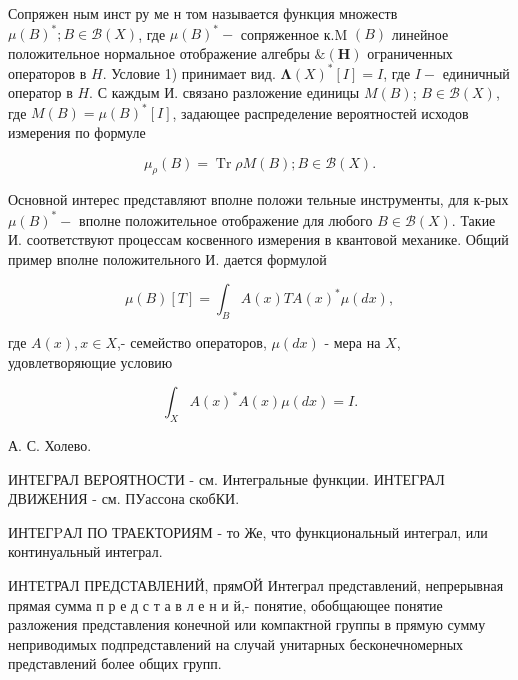 \documentclass[10pt]{article}
\begin{document}
Сопряжен ным инст ру ме н том называется функция множеств $\mu(B)^{*} ; B \in \mathscr{B}(X)$, где $\mathscr{\mu}(B)^{*}-$ сопряженное к.M $(B)$ линейное положительное нормальное отображение алгебры $\mathcal{\&}(\boldsymbol{H})$ ограниченных операторов в $H$. Условие 1) принимает вид. $\boldsymbol{\Lambda}(X)^{*}[I]=I$, где $I-$ единичный оператор в $H$. С каждым И. связано разложение единицы $M(B)$; $B \in \mathcal{B}(X)$, где $M(B)=\mathscr{\mu}(B)^{*}[I]$, задающее распределение вероятностей исходов измерения по формуле



\[

\mu_{\rho}(B)=\operatorname{Tr} \rho M(B) ; B \in \mathscr{B}(X) .

\]



Основной интерес представляют вполне положи тельные инструменты, для к-рых $\mathscr{\mu}(B)^{*}-$ вполне положительное отображение для любого $B \in \mathscr{B}(X)$. Такие И. соответствуют процессам косвенного измерения в квантовой механике. Общий пример вполне положительного И. дается формулой



\[

\mu(B)[T]=\int_{B} A(x) T A(x)^{*} \mu(d x),

\]



где $A(x), x \in X$,- семейство операторов, $\mu(d x)$ - мера на $X$, удовлетворяющие условию



\[

\int_{X} A(x)^{*} A(x) \mu(d x)=I .

\]



А. С. Холево.



ИНТЕГРАЛ ВЕРОЯТНОСТИ - см. Интегральные функции. ИНТЕГРАЛ ДВИЖЕНИЯ - см. ПУассона скобКИ.



ИНТЕГPАЛ ПО ТРАЕКТОРИЯМ - то Же, что функциональный интеграл, или континуальный интеграл.



ИНТЕТРАЛ ПРЕДСТАВЛЕНИЙ, прямОЙ Интеграл представлений, непрерывная прямая сумма п р е д с т а в л е н и й,- понятие, обобщающее понятие разложения представления конечной или компактной группы в прямую сумму неприводимых подпредставлений на случай унитарных бесконечномерных представлений более общих групп.
\end{document}

